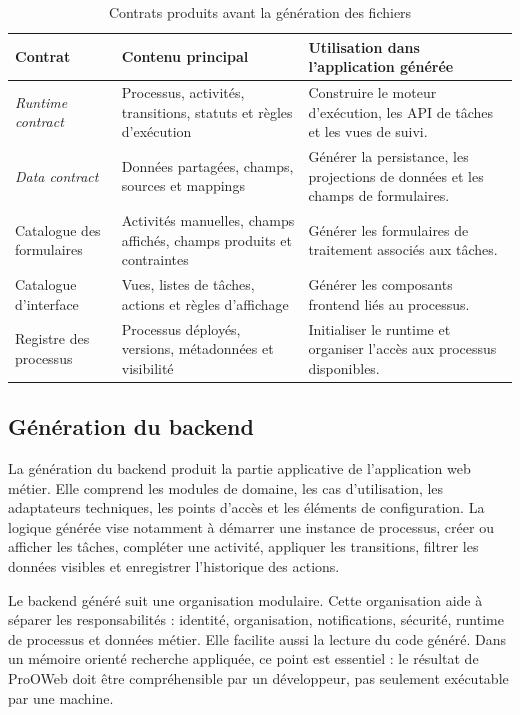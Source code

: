 \begin{table}[H]
\centering
\small
\caption{Contrats produits avant la génération des fichiers}
\label{tab:chap4-contrats-generation}
\begin{tabular}{p{3.8cm}p{5.0cm}p{4.8cm}}
\hline
\textbf{Contrat} & \textbf{Contenu principal} & \textbf{Utilisation dans l'application générée} \\
\hline
\textit{Runtime contract} & Processus, activités, transitions, statuts et règles d'exécution & Construire le moteur d'exécution, les API de tâches et les vues de suivi. \\
\textit{Data contract} & Données partagées, champs, sources et mappings & Générer la persistance, les projections de données et les champs de formulaires. \\
Catalogue des formulaires & Activités manuelles, champs affichés, champs produits et contraintes & Générer les formulaires de traitement associés aux tâches. \\
Catalogue d'interface & Vues, listes de tâches, actions et règles d'affichage & Générer les composants frontend liés au processus. \\
Registre des processus & Processus déployés, versions, métadonnées et visibilité & Initialiser le runtime et organiser l'accès aux processus disponibles. \\
\hline
\end{tabular}
\end{table}

\subsection{Génération du backend}

La génération du backend produit la partie applicative de l'application web métier. Elle comprend les modules de domaine, les cas d'utilisation, les adaptateurs techniques, les points d'accès et les éléments de configuration. La logique générée vise notamment à démarrer une instance de processus, créer ou afficher les tâches, compléter une activité, appliquer les transitions, filtrer les données visibles et enregistrer l'historique des actions.

Le backend généré suit une organisation modulaire. Cette organisation aide à séparer les responsabilités : identité, organisation, notifications, sécurité, runtime de processus et données métier. Elle facilite aussi la lecture du code généré. Dans un mémoire orienté recherche appliquée, ce point est essentiel : le résultat de ProOWeb doit être compréhensible par un développeur, pas seulement exécutable par une machine.

